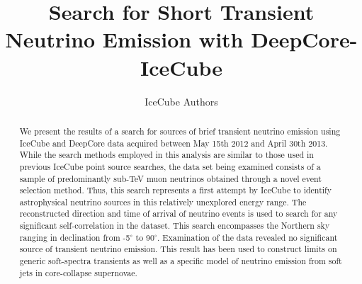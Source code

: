 \documentclass[manuscript]{aastex}
\begin{document}

\title{Search for Short Transient Neutrino Emission with DeepCore-IceCube}
\author{IceCube Authors}

\begin{abstract}
We present the results of a search for sources of brief transient neutrino emission using IceCube and DeepCore data acquired between May 15th 2012 and April 30th 2013. While the search methods employed in this analysis are similar to those used in previous IceCube point source searches, the data set being examined consists of a sample of predominantly sub-TeV muon neutrinos obtained through a novel event selection method. Thus, this search represents a first attempt by IceCube to identify astrophysical neutrino sources in this relatively unexplored energy range. The reconstructed direction and time of arrival of neutrino events is used to search for any significant self-correlation in the dataset. This search encompasses the Northern sky ranging in declination from -5$^{\circ}$ to 90$^{\circ}$. Examination of the data revealed no significant source of transient neutrino emission. This result has been used to construct limits on generic soft-spectra transients as well as a specific model of neutrino emission from soft jets in core-collapse supernovae.
\end{abstract}


\end{document}
